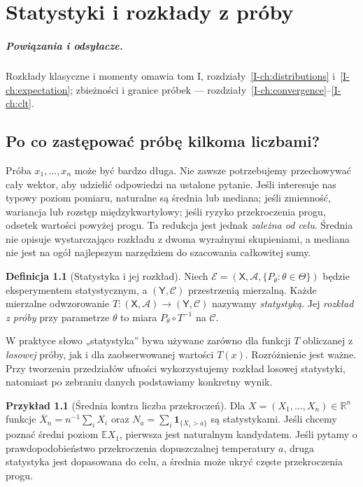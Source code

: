 \documentclass[11pt,a4paper,oneside]{report}
\numberwithin{equation}{chapter}
\theoremstyle{plain}
\theoremstyle{definition}
\newtheorem{definicja}{Definicja}[chapter]
\newtheorem{przyklad}{Przykład}[chapter]
\theoremstyle{remark}
\newcommand{\R}{\mathbb R}
\newcommand{\E}{\mathbb E}
\newcommand{\calA}{\mathcal A}
\newcommand{\ind}[1]{\mathbf 1_{#1}}
\begin{document}
\chapter{Statystyki i rozkłady z próby}
\label{ch:statystyki}
\paragraph{Powiązania i odsyłacze.} Rozkłady klasyczne i momenty omawia tom I, rozdziały~\ref{I-ch:distributions} i~\ref{I-ch:expectation}; zbieżności i granice próbek — rozdziały~\ref{I-ch:convergence}--\ref{I-ch:clt}.

\section{Po co zastępować próbę kilkoma liczbami?}
Próba $x_1,\ldots,x_n$ może być bardzo długa. Nie zawsze potrzebujemy przechowywać cały wektor, aby udzielić odpowiedzi na ustalone pytanie. Jeśli interesuje nas typowy poziom pomiaru, naturalne są średnia lub mediana; jeśli zmienność, wariancja lub rozstęp międzykwartylowy; jeśli ryzyko przekroczenia progu, odsetek wartości powyżej progu. Ta redukcja jest jednak \emph{zależna od celu}. Średnia nie opisuje wystarczająco rozkładu z dwoma wyraźnymi skupieniami, a mediana nie jest na ogół najlepszym narzędziem do szacowania całkowitej sumy.

\begin{definicja}[Statystyka i jej rozkład]\label{def:statistic}
Niech $\mathcal E=(\mathsf X,\calA,\{P_\theta:\theta\in\Theta\})$ będzie eksperymentem statystycznym, a $(\mathsf Y,\mathcal C)$ przestrzenią mierzalną. Każde mierzalne odwzorowanie $T:(\mathsf X,\calA)\to(\mathsf Y,\mathcal C)$ nazywamy \emph{statystyką}. Jej \emph{rozkład z próby} przy parametrze $\theta$ to miara $P_\theta\circ T^{-1}$ na $\mathcal C$.
\end{definicja}

W praktyce słowo „statystyka” bywa używane zarówno dla funkcji $T$ obliczanej z \emph{losowej} próby, jak i dla zaobserwowanej wartości $T(x)$. Rozróżnienie jest ważne. Przy tworzeniu przedziałów ufności wykorzystujemy rozkład losowej statystyki, natomiast po zebraniu danych podstawiamy konkretny wynik.

\begin{przyklad}[Średnia kontra liczba przekroczeń]
Dla $X=(X_1,\ldots,X_n)\in\R^n$ funkcje $\overline X_n=n^{-1}\sum_iX_i$ oraz $N_a=\sum_i\ind{\{X_i>a\}}$ są statystykami. Jeśli chcemy poznać średni poziom $\E X_1$, pierwsza jest naturalnym kandydatem. Jeśli pytamy o prawdopodobieństwo przekroczenia dopuszczalnej temperatury $a$, druga statystyka jest dopasowana do celu, a średnia może ukryć częste przekroczenia progu.
\end{przyklad}
\end{document}
